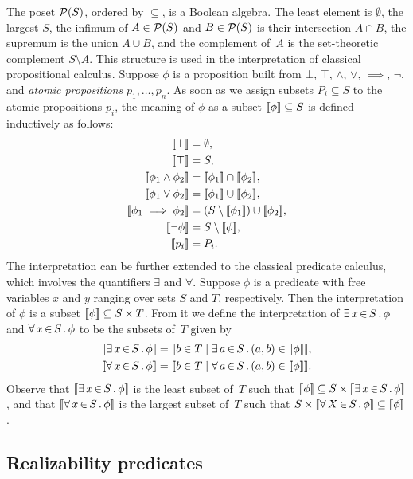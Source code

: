 The poset $\mathcal{P}(S)$, ordered by $\subseteq$, is a Boolean algebra. The
least element is $\emptyset$, the largest $S$, the infimum of $A \in
\mathcal{P}(S)$ and $B \in \mathcal{P}(S)$ is their intersection $A \cap B$, the
supremum is the union $A \cup B$, and the complement of~$A$ is the
set-theoretic complement $S \setminus A$. This structure is used in
the interpretation of classical propositional calculus. Suppose $\phi$
is a proposition built from $\bot$, $\top$, $\land$, $\lor$,
$\implies$, $\lnot$, and \emph{atomic propositions} $p_1, \ldots,
p_n$. As soon as we assign subsets $P_i \subseteq S$ to the atomic
propositions $p_i$, the meaning of $\phi$ as a subset $[\![\phi]\!]
\subseteq S$ is defined inductively as follows:
%
\begin{align*}
  \sem{\bot} &= \emptyset,\\
  \sem{\top} &= S,\\
  \sem{\phi_1 \land \phi_2} &= \sem{\phi_1} \cap \sem{\phi_2},\\
  \sem{\phi_1 \lor \phi_2} &= \sem{\phi_1} \cup \sem{\phi_2},\\
  \sem{\phi_1 \implies \phi_2} &= (S \setminus \sem{\phi_1}) \cup \sem{\phi_2},\\
  \sem{\lnot \phi} &= S \setminus \sem{\phi},\\
  \sem{p_i} &= P_i.
\end{align*}
%
The interpretation can be further extended to the classical predicate
calculus, which involves the quantifiers $\exists$ and $\forall$.
Suppose $\phi$ is a predicate with free variables $x$ and $y$ ranging
over sets $S$ and $T$, respectively. Then the interpretation of $\phi$
is a subset $[\![\phi]\!] \subseteq S \times T$. From it we define the
interpretation of $\exists\, x \,{\in}\, S\,.\,\phi$ and $\forall\, x \,{\in}\, S\,.\,\phi$ to be
the subsets of~$T$ given by
%
\begin{align*}
  \sem{\xsome{x}{S}{\phi}} &=
  \sem{b \in T \such \xsome{a}{S}{(a,b) \in \sem{\phi}}}, \\
  \sem{\xall{x}{S}{\phi}} &=
  \sem{b \in T \such \xall{a}{S}{(a,b) \in \sem{\phi}}}.
\end{align*}
%
Observe that $[\![\exists\, x \,{\in}\, S\,.\,\phi]\!]$ is the least subset of~$T$
such that $[\![\phi]\!] \subseteq S \times [\![\exists\, x \,{\in}\, S\,.\,\phi]\!]$,
and that $[\![\forall\, x \,{\in}\, S\,.\,\phi]\!]$ is the largest subset of~$T$ such
that $S \times [\![\forall\, X \,{\in}\, S\,.\,\phi]\!] \subseteq [\![\phi]\!]$.

\subsection{Realizability predicates}
\label{sec:realizability-predicates}


